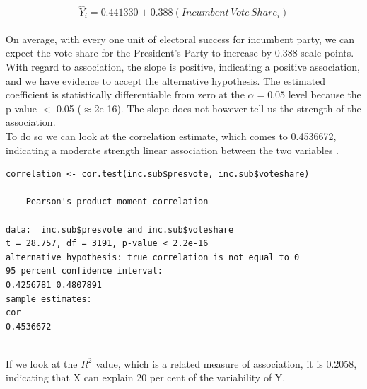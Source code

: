 \documentclass[12pt,letterpaper]{article}
\begin{document}
{ 			$$\hat{Y}_i =  0.441330 +  0.388(Incumbent \, Vote \, Share_i) $$} \\


\noindent On average, with every one unit of electoral success for incumbent party, we can expect the vote share for the President's Party to increase by 0.388 scale points.\\

\noindent With regard to association, the slope is positive, indicating a positive association, and we have evidence to accept the alternative hypothesis. The estimated coefficient is statistically differentiable from zero at the $\alpha=0.05$ level because the p-value $<$ 0.05 ($\approx $2e-16). The slope does not however tell us the strength of the association. \\

\noindent To do so we can look at the correlation estimate, which comes to 0.4536672, indicating a moderate strength linear association between the two variables .

	\begin{verbatim}
correlation <- cor.test(inc.sub$presvote, inc.sub$voteshare)

	Pearson's product-moment correlation

data:  inc.sub$presvote and inc.sub$voteshare
t = 28.757, df = 3191, p-value < 2.2e-16
alternative hypothesis: true correlation is not equal to 0
95 percent confidence interval:
0.4256781 0.4807891
sample estimates:
cor 
0.4536672 
	
\end{verbatim}

If we look at the $R^2$ value, which is a related measure of association, it is 0.2058, indicating that X can explain 20 per cent of the variability of Y. 




\newpage	
\end{document}
